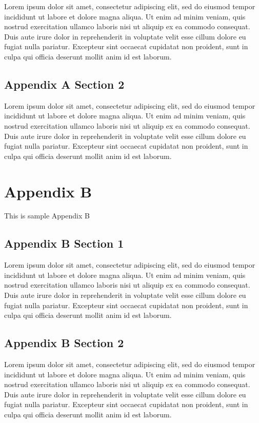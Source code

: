 \documentclass[
  letterpaper,
  DIV=11,
  numbers=noendperiod]{scrreprt}
\begin{document}
Lorem ipsum dolor sit amet, consectetur adipiscing elit, sed do eiusmod
tempor incididunt ut labore et dolore magna aliqua. Ut enim ad minim
veniam, quis nostrud exercitation ullamco laboris nisi ut aliquip ex ea
commodo consequat. Duis aute irure dolor in reprehenderit in voluptate
velit esse cillum dolore eu fugiat nulla pariatur. Excepteur sint
occaecat cupidatat non proident, sunt in culpa qui officia deserunt
mollit anim id est laborum.

\section{Appendix A Section 2}\label{appendix-a-section-2}

Lorem ipsum dolor sit amet, consectetur adipiscing elit, sed do eiusmod
tempor incididunt ut labore et dolore magna aliqua. Ut enim ad minim
veniam, quis nostrud exercitation ullamco laboris nisi ut aliquip ex ea
commodo consequat. Duis aute irure dolor in reprehenderit in voluptate
velit esse cillum dolore eu fugiat nulla pariatur. Excepteur sint
occaecat cupidatat non proident, sunt in culpa qui officia deserunt
mollit anim id est laborum.

\chapter{Appendix B}\label{appendix-b-1}

This is sample Appendix B

\section{Appendix B Section 1}\label{appendix-b-section-1}

Lorem ipsum dolor sit amet, consectetur adipiscing elit, sed do eiusmod
tempor incididunt ut labore et dolore magna aliqua. Ut enim ad minim
veniam, quis nostrud exercitation ullamco laboris nisi ut aliquip ex ea
commodo consequat. Duis aute irure dolor in reprehenderit in voluptate
velit esse cillum dolore eu fugiat nulla pariatur. Excepteur sint
occaecat cupidatat non proident, sunt in culpa qui officia deserunt
mollit anim id est laborum.

\section{Appendix B Section 2}\label{appendix-b-section-2}

Lorem ipsum dolor sit amet, consectetur adipiscing elit, sed do eiusmod
tempor incididunt ut labore et dolore magna aliqua. Ut enim ad minim
veniam, quis nostrud exercitation ullamco laboris nisi ut aliquip ex ea
commodo consequat. Duis aute irure dolor in reprehenderit in voluptate
velit esse cillum dolore eu fugiat nulla pariatur. Excepteur sint
occaecat cupidatat non proident, sunt in culpa qui officia deserunt
mollit anim id est laborum.
\end{document}
